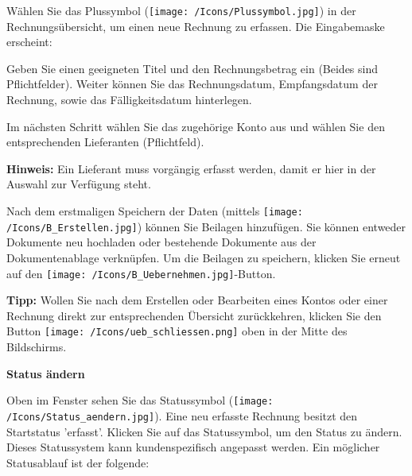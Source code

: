 Wählen Sie das Plussymbol (\texttt{[image: /Icons/Plussymbol.jpg]}) in der Rechnungsübersicht, um einen neue Rechnung zu erfassen. Die Eingabemaske erscheint:
 
\vspace{6cm}

Geben Sie einen geeigneten Titel und den Rechnungsbetrag ein (Beides sind Pflichtfelder). Weiter können Sie das Rechnungsdatum, Empfangsdatum der Rechnung, sowie das Fälligkeitsdatum hinterlegen.

\vspace{\baselineskip}

Im nächsten Schritt wählen Sie das zugehörige Konto aus und wählen Sie den entsprechenden Lieferanten (Pflichtfeld).

\vspace{\baselineskip}

\textbf{Hinweis:} Ein Lieferant muss vorgängig erfasst werden, damit er hier in der Auswahl zur Verfügung steht.

\vspace{\baselineskip}

Nach dem erstmaligen Speichern der Daten (mittels \texttt{[image: /Icons/B\_Erstellen.jpg]}) können Sie Beilagen hinzufügen. Sie können entweder Dokumente neu hochladen oder bestehende Dokumente aus der Dokumentenablage verknüpfen. Um die Beilagen zu speichern, klicken Sie erneut auf den \texttt{[image: /Icons/B\_Uebernehmen.jpg]}-Button. 

\vspace{\baselineskip}

\textbf{Tipp:} Wollen Sie nach dem Erstellen oder Bearbeiten eines Kontos oder einer Rechnung direkt zur entsprechenden Übersicht zurückkehren, klicken Sie den Button \texttt{[image: /Icons/ueb\_schliessen.png]} oben in der Mitte des Bildschirms.

\vspace{\baselineskip}

\pagebreak
\textbf{Status ändern}

\vspace{\baselineskip}

Oben im Fenster sehen Sie das Statussymbol (\texttt{[image: /Icons/Status\_aendern.jpg]}). Eine neu erfasste Rechnung besitzt den Startstatus 'erfasst'. Klicken Sie auf das Statussymbol, um den Status zu ändern. Dieses Statussystem kann kundenspezifisch angepasst werden. Ein möglicher Statusablauf ist der folgende:

